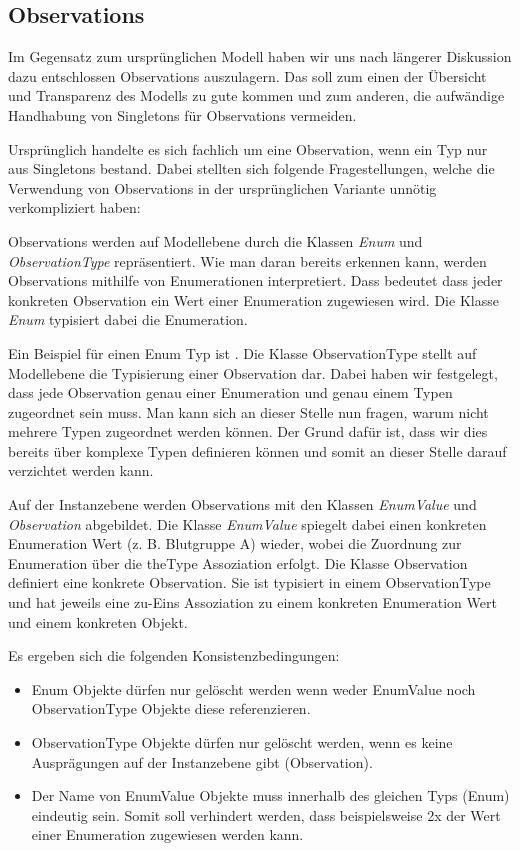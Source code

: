 \subsection{Observations}\label{Observations}
Im Gegensatz zum ursprünglichen Modell haben wir uns nach längerer Diskussion dazu entschlossen Observations auszulagern. 
Das soll zum einen der Übersicht und Transparenz des Modells zu gute kommen und zum anderen, 
die aufwändige Handhabung von Singletons für Observations vermeiden.
 
Ursprünglich handelte es sich fachlich um eine Observation, wenn ein Typ nur aus Singletons bestand. 
Dabei stellten sich folgende Fragestellungen, welche die Verwendung von Observations in der ursprünglichen Variante unnötig verkompliziert haben:


Observations werden auf Modellebene durch die Klassen \emph{Enum} und \emph{ObservationType} repräsentiert. 
Wie man daran bereits erkennen kann, werden Observations mithilfe von Enumerationen interpretiert. 
Dass bedeutet dass jeder konkreten Observation ein Wert einer Enumeration zugewiesen wird. 
Die Klasse \emph{Enum} typisiert dabei die Enumeration. 

Ein Beispiel für einen Enum Typ ist . Die Klasse ObservationType stellt auf Modellebene die 
Typisierung einer Observation dar. Dabei haben wir festgelegt, dass jede Observation genau einer Enumeration 
und genau einem Typen zugeordnet sein muss. Man kann sich an dieser Stelle nun fragen, warum nicht mehrere Typen 
zugeordnet werden können. Der Grund dafür ist, dass wir dies bereits über komplexe Typen definieren können und somit 
an dieser Stelle darauf verzichtet werden kann.

Auf der Instanzebene werden Observations mit den Klassen \emph{EnumValue} und \emph{Observation} abgebildet. 
Die Klasse \emph{EnumValue} spiegelt dabei einen konkreten Enumeration Wert (z. B. Blutgruppe A) wieder, 
wobei die Zuordnung zur Enumeration über die theType Assoziation erfolgt. 
Die Klasse Observation definiert eine konkrete Observation. 
Sie ist typisiert in einem ObservationType und hat jeweils eine zu-Eins Assoziation zu einem konkreten Enumeration Wert 
und einem konkreten Objekt.

Es ergeben sich die folgenden Konsistenzbedingungen:
\begin{itemize}
  \item Enum Objekte dürfen nur gelöscht werden wenn weder EnumValue noch ObservationType Objekte diese referenzieren.
  \item ObservationType Objekte dürfen nur gelöscht werden, wenn es keine Ausprägungen auf der Instanzebene gibt (Observation).
  \item Der Name von EnumValue Objekte muss innerhalb des gleichen Typs (Enum) eindeutig sein. Somit soll verhindert werden, dass beispielsweise 2x der Wert  einer Enumeration  zugewiesen werden kann.
\end{itemize}

